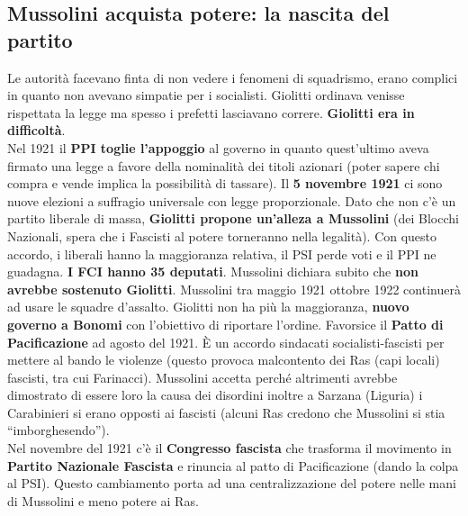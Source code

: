 \subsection{Mussolini acquista potere: la nascita del partito}
Le autorità facevano finta di non vedere i fenomeni di squadrismo, erano complici in quanto non 
avevano simpatie per i socialisti. Giolitti ordinava venisse rispettata la legge ma spesso i
prefetti lasciavano correre. \textbf{Giolitti era in difficoltà}.\\
Nel 1921 il \textbf{PPI toglie l'appoggio} al governo in quanto quest'ultimo aveva firmato una legge
a favore della nominalità dei titoli azionari (poter sapere chi compra e vende implica la possibilità
di tassare). Il \textbf{5 novembre 1921} ci sono nuove elezioni a suffragio universale con legge
proporzionale. Dato che non c'è un partito liberale di massa, \textbf{Giolitti propone un'alleza a
Mussolini} (dei Blocchi Nazionali, spera che i Fascisti al potere torneranno nella legalità). Con
questo accordo, i liberali hanno la maggioranza relativa, il PSI perde voti e il PPI ne guadagna.
\textbf{I FCI hanno 35 deputati}. Mussolini dichiara subito che \textbf{non avrebbe sostenuto 
Giolitti}. Mussolini tra maggio 1921 ottobre 1922 continuerà ad usare le squadre d'assalto. Giolitti
non ha più la maggioranza, \textbf{nuovo governo a Bonomi} con l'obiettivo di riportare l'ordine.
Favorsice il \textbf{Patto di Pacificazione} ad agosto del 1921. È un accordo sindacati 
socialisti-fascisti per mettere al bando le violenze (questo provoca malcontento dei Ras (capi 
locali) fascisti, tra cui Farinacci). Mussolini accetta perché altrimenti avrebbe dimostrato di 
essere loro la causa dei disordini inoltre a Sarzana (Liguria) i Carabinieri si erano opposti
ai fascisti (alcuni Ras credono che Mussolini si stia ``imborghesendo'').\\ [\baselineskip]
Nel novembre del 1921 c'è il \textbf{Congresso fascista} che trasforma il movimento in 
\textbf{Partito Nazionale Fascista} e rinuncia al patto di Pacificazione (dando la colpa al PSI).
Questo cambiamento porta ad una centralizzazione del potere nelle mani di Mussolini e meno potere
ai Ras.

